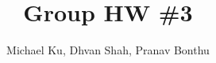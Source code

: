 \documentclass[11pt]{article}
\begin{document}
\title{Group HW \#3}
\author{Michael Ku, Dhvan Shah, Pranav Bonthu}
\maketitle







\end{document}
